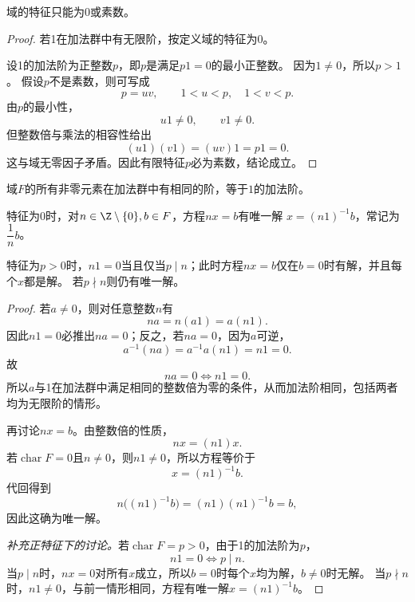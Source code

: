 \begin{theorem}
域的特征只能为$0$或素数。
\end{theorem}
\begin{proof}
若1在加法群中有无限阶，按定义域的特征为0。

设1的加法阶为正整数$p$，即$p$是满足$p1=0$的最小正整数。
因为$1\neq0$，所以$p>1$。
假设$p$不是素数，则可写成
\[
p=uv,\qquad 1<u<p,\quad1<v<p.
\]
由$p$的最小性，
\[
u1\neq0,\qquad v1\neq0.
\]
但整数倍与乘法的相容性给出
\[
(u1)(v1)=(uv)1=p1=0.
\]
这与域无零因子矛盾。因此有限特征$p$必为素数，结论成立。
\end{proof}

\begin{proposition}
域$F$的所有非零元素在加法群中有相同的阶，等于$1$的加法阶。

特征为0时，对$n\in\Z\setminus\{0\},b\in F$，方程$nx=b$有唯一解
$x=(n1)^{-1}b$，常记为$\dfrac1n b$。

特征为$p>0$时，$n1=0$当且仅当$p\mid n$；此时方程$nx=b$仅在$b=0$时有解，并且每个$x$都是解。
若$p\nmid n$则仍有唯一解。
\end{proposition}
\begin{proof}
若$a\neq0$，则对任意整数$n$有
\[
na=n(a1)=a(n1).
\]
因此$n1=0$必推出$na=0$；反之，若$na=0$，因为$a$可逆，
\[
a^{-1}(na)=a^{-1}a(n1)=n1=0.
\]
故
\[
na=0\iff n1=0.
\]
所以$a$与1在加法群中满足相同的整数倍为零的条件，从而加法阶相同，包括两者均为无限阶的情形。

再讨论$nx=b$。由整数倍的性质，
\[
nx=(n1)x.
\]
若$\operatorname{char}F=0$且$n\neq0$，则$n1\neq0$，所以方程等价于
\[
x=(n1)^{-1}b.
\]
代回得到
\[
n\bigl((n1)^{-1}b\bigr)=(n1)(n1)^{-1}b=b,
\]
因此这确为唯一解。

\textit{补充正特征下的讨论。}若$\operatorname{char}F=p>0$，由于1的加法阶为$p$，
\[
n1=0\iff p\mid n.
\]
当$p\mid n$时，$nx=0$对所有$x$成立，所以$b=0$时每个$x$均为解，$b\neq0$时无解。
当$p\nmid n$时，$n1\neq0$，与前一情形相同，方程有唯一解$x=(n1)^{-1}b$。
\end{proof}

